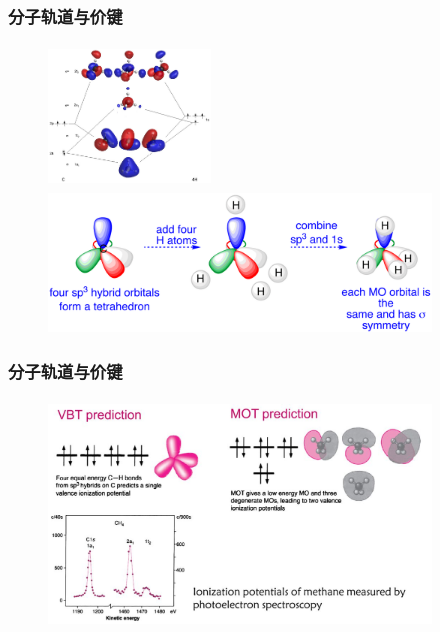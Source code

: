 \frame
{
	\frametitle{分子轨道与价键}
\begin{figure}[h!]
\centering
\vspace{-10.5pt}
\includegraphics[height=1.50in,width=1.70in,viewport=0 0 820 680,clip]{Figures/MO-CH4.jpg}
\includegraphics[height=1.45in,width=4.00in,viewport=0 0 2100 750,clip]{Figures/methane-sp3.png}
\label{MO-vs-VB:CH4}
\end{figure}
}

\frame
{
	\frametitle{分子轨道与价键}
\begin{figure}[h!]
\centering
\vspace{-10.5pt}
\includegraphics[height=2.40in,width=4.00in,viewport=0 0 1050 630,clip]{Figures/QM_bond-order.jpg}
\label{MO-vs-VB}
\end{figure}
}


